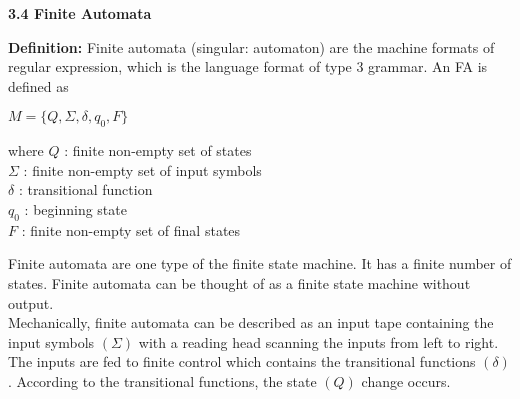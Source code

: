 \documentclass[8pt]{beamer}
\begin{document}
\begin{frame}
\large{
\textbf{3.4 Finite Automata}\\
}

\vspace*{0.2cm}
\small{
\textbf{Definition:} Finite automata (singular: automaton) are the machine formats of regular expression, which
is the language format of type 3 grammar. An FA is defined as\\
\begin{center}
  $M = \{Q, \Sigma, \delta, q_{0}, F\}$ \\
\end{center}

\vspace*{0.2cm}
where \hspace*{0.5cm} $Q$ : finite non-empty set of states\\
\hspace*{1.3cm} $\Sigma$ : finite non-empty set of input symbols\\
\hspace*{1.3cm} $\delta$ : transitional function\\
\hspace*{1.3cm} $q_{0}$ : beginning state\\
\hspace*{1.3cm} $F$ : finite non-empty set of final states\\
}

\vspace*{0.2cm}
Finite automata are one type of the finite state machine. It has a finite number of states. Finite automata
can be thought of as a finite state machine without output.\\
\hspace*{0.5cm} Mechanically, finite automata can be described as an input tape containing the input symbols $(\Sigma)$ with
a reading head scanning the inputs from left to right. The inputs are fed to finite control which contains
the transitional functions $(\delta)$. According to the transitional functions, the state $(Q)$ change occurs.\\

\end{frame}
\end{document}
